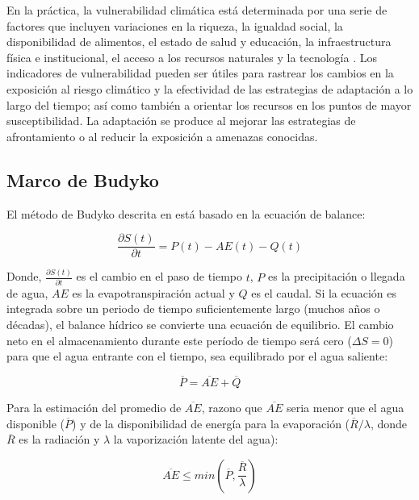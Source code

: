 \documentclass[12pt]{article}
\begin{document}
En la práctica, la vulnerabilidad climática está determinada por una serie de factores que incluyen variaciones en la riqueza, la igualdad social, la disponibilidad de alimentos, el estado de salud y educación, la infraestructura física e institucional, el acceso a los recursos naturales y la tecnología \citep{Brooks2005}. Los indicadores de vulnerabilidad pueden ser útiles para rastrear los cambios en la exposición al riesgo climático y la efectividad de las estrategias de adaptación a lo largo del tiempo; así como también a orientar los recursos en los puntos de mayor susceptibilidad. La adaptación se produce al mejorar las estrategias de afrontamiento o al reducir la exposición a amenazas conocidas.

\subsection{Marco de Budyko}

El método de Budyko \citep{Budyko1961,Pike1964} descrita en \citet{Zhang2008} está basado en la ecuación de balance:

\begin{equation}
\frac{\partial S(t)}{\partial t} = P(t) - AE(t) - Q(t) 
\end{equation}

Donde, $\frac{\partial S(t)}{\partial t}$ es el cambio en el paso de tiempo $t$, $P$ es la precipitación o llegada de agua, $AE$ es la evapotranspiración actual y $Q$ es el caudal. Si la ecuación es integrada sobre un periodo de tiempo suficientemente largo (muchos años o décadas), el balance hídrico se convierte una ecuación de equilibrio. El cambio neto en el almacenamiento durante este período de tiempo será cero ($\Delta S = 0$) para que el agua entrante con el tiempo, sea equilibrado por el agua saliente:

\begin{equation}
\overline{P} = \overline{AE} + \overline{Q} 
\label{equ:WB}
\end{equation}

Para la estimación del promedio de $\overline{AE}$, \citet{Budyko1961} razono que $\overline{AE}$ seria menor que el agua disponible ($\overline{P}$) y de la disponibilidad de energía para la evaporación ($\overline{R}/\lambda$, donde $\overline{R}$ es la radiación y $\lambda$ la vaporización latente del agua):

\begin{equation}
\overline{AE} \leq min(\overline{P}, \frac{\overline{R}}{\lambda })
\end{equation}
\end{document}
